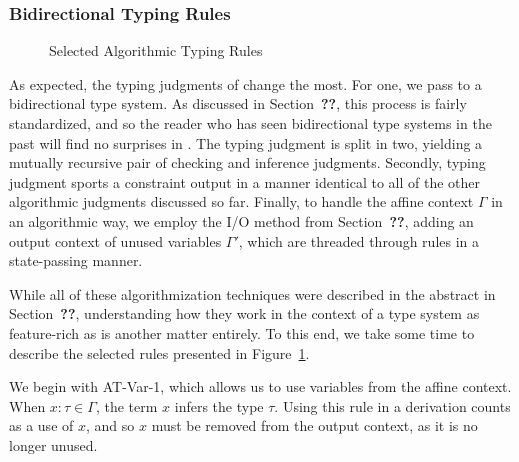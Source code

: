 \subsubsection{Bidirectional Typing Rules}

\begin{figure}

\caption{Selected Algorithmic Typing Rules}
\label{fig:bilambdaamor-selected-typing-rules}
\end{figure}

As expected, the typing judgments of \bilambdaamor change the most. For one, we pass to a bidirectional type system. As discussed in Section~\textbf{??}, this process is fairly standardized, and so the reader who has seen bidirectional type systems in the past will find no surprises in \bilambdaamor. The typing judgment is split in two, yielding a mutually recursive pair of checking and inference judgments. Secondly, typing judgment sports a constraint output in a manner identical to all of the other algorithmic judgments discussed so far. Finally, to handle the affine context $\Gamma$ in an algorithmic way, we employ the I/O method from Section~\textbf{??}, adding an output context of unused variables $\Gamma'$, which are threaded through rules in a state-passing manner.

While all of these algorithmization techniques were described in the abstract in Section~\textbf{??}, understanding how they work in the context of a type system as feature-rich as \bilambdaamor is another matter entirely. To this end, we take some time to describe the selected rules presented in Figure~\ref{fig:bilambdaamor-selected-typing-rules}.

We begin with AT-Var-1, which allows us to use variables from the affine context. When $x : \tau \in \Gamma$, the term $x$ infers the type $\tau$. Using this rule in a derivation counts as a use of $x$, and so $x$ must be removed from the output context, as it is no longer unused.

